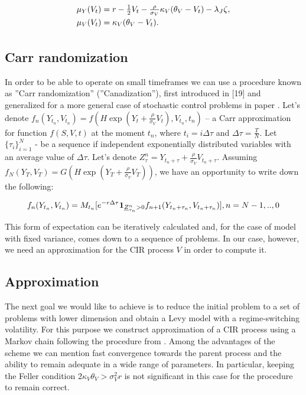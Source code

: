 \documentclass[a4paper]{jpconf}
\begin{document}
\begin{equation*}
\begin{array}{l}
\mu_Y(V_t) = r - \frac{1}{2}V_t - \frac{\rho}{\sigma_V}\kappa_V(\theta_V - V_t)  - \lambda_J \zeta,
\smallskip\\
\mu_V(V_t) = \kappa_V(\theta_V - V_t).
\smallskip\\
\end{array}
\end{equation*}

\subsection{Carr randomization}


In order to be able to operate on small timeframes we can use a procedure known as ''Carr randomization'' (''Canadization''), first introduced in [19] and generalized for a more general case of stochastic control problems in paper \cite{touzi}. Let's denote $f_{n}({Y}_{t_n}, {V}_{t_n}) = f(H\exp(Y_t + \frac{\rho}{\sigma_V}V_t), {V}_{t_n}, t_n)$ -- a Carr approximation for function $f(S,V,t)$ at the moment $t_n$, where $t_i = i \Delta \tau$ and $\Delta \tau = \frac{T}{N}$. Let $\{\tau_i\}_{i=1}^N$ - be a sequence if independent exponentially distributed variables with an average value of $\Delta \tau$. Let's denote $Z_\tau^n=Y_{t_n + \tau}+\frac{\rho}{\sigma_V}V_{t_n + \tau}$.
Assuming $f_{N}(Y_T, V_T)=G(H\exp (Y_T+\frac{\rho}{\sigma_V}V_T ))$, we have an opportunity to write down the following:

$$
f_{n}({Y}_{t_n}, {V}_{t_n}) = M_{t_{n}} [ e^{-r\Delta \tau}  
{\bf 1}_{\underline{Z}^n_{\tau_n} > 0} f_{n+1}(Y_{t_n+\tau_n},V_{t_n+\tau_n})], \smallskip\\ n = N-1,..,0 
$$

This form of expectation can be iteratively calculated and, for the case of model with fixed variance, comes down to a sequence of problems. In our case, however, we need an approximation for the CIR process $V$ in order to compute it.

\subsection{Approximation}

The next goal we would like to achieve is to reduce the initial problem to a set of problems with lower dimension and obtain a Levy model with a regime-switching volatility. For this purpose we construct approximation of a CIR process using a Markov chain following the procedure from \cite{zanette_tree}. Among the advantages of the scheme we can mention fast convergence towards the parent process and the ability to remain adequate in a wide range of parameters. In particular, keeping the Feller condition $2\kappa_V\theta_V>\sigma_V^2r$ is not significant in this case for the procedure to remain correct.
\end{document}
